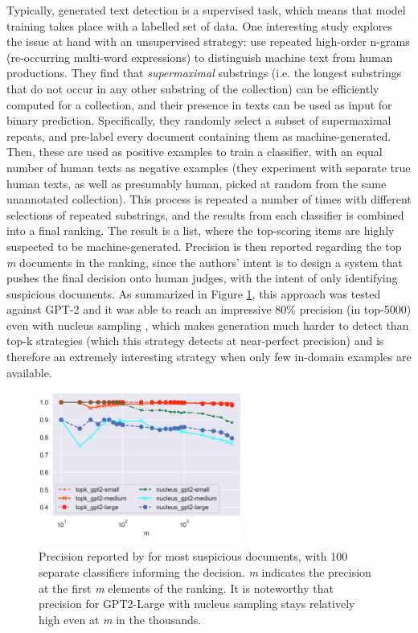 Typically, generated text detection is a supervised task, which means that model training takes place with a labelled set of data.
One interesting study explores the issue at hand with an unsupervised strategy: \citet{galle2021unsupervised} use repeated high-order n-grams (re-occurring multi-word expressions) to distinguish machine text from human productions.
They find that \emph{supermaximal} substrings (i.e. the longest substrings that do not occur in any other substring of the collection) can be efficiently computed for a collection, and their presence in texts can be used as input for binary prediction.
Specifically, they randomly select a subset of supermaximal repeats, and pre-label every document containing them as machine-generated. Then, these are used as positive examples to train a classifier, with an equal number of human texts as negative examples (they experiment with separate true human texts, as well as presumably human, picked at random from the same unannotated collection).
This process is repeated a number of times with different selections of repeated substrings, and the results from each classifier is combined into a final ranking.
The result is a list, where the top-scoring items are highly suspected to be machine-generated.
Precision is then reported regarding the top \emph{m} documents in the ranking, since the authors' intent is to design a system that pushes the final decision onto human judges, with the intent of only identifying suspicious documents.
As summarized in Figure \ref{fig:galle2021_fig5_100models}, this approach was tested against GPT-2 and it was able to reach an impressive 80\% precision (in top-5000) even with nucleus sampling \citep{holtzman2019curious}, which makes generation much harder to detect than top-k strategies (which this strategy detects at near-perfect precision) and is therefore an extremely interesting strategy when only few in-domain examples are available.

\begin{figure}[h]
    \centering
    \includegraphics[width=0.6\textwidth]{assets/galle2021_fig5_100models.png}
    \caption{
        Precision reported by \citet{galle2021unsupervised} for most suspicious documents, with 100 separate classifiers informing the decision.
        \emph{m} indicates the precision at the first \emph{m} elements of the ranking.
        It is noteworthy that precision for GPT2-Large with nucleus sampling stays relatively high even at \emph{m} in the thousands.
    }
    \label{fig:galle2021_fig5_100models}
\end{figure}

